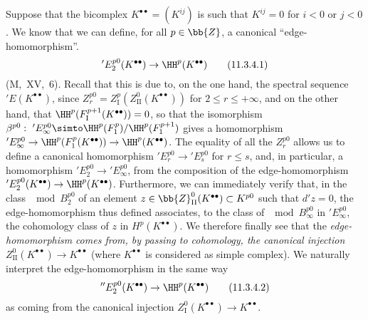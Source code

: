 \begin{env}[11.3.4]
\label{0.11.3.4}
Suppose that the bicomplex $K^{\bullet\bullet}=(K^{ij})$ is such that $K^{ij}=0$ for $i<0$ or $j<0$.
We know that we can define, for all $p\in\bb{Z}$, a canonical ``edge-homomorphism''.
\[
\label{0.11.3.4.1}
  'E_2^{p0}(K^{\bullet\bullet})
  \rightarrow \HH^{p}(K^{\bullet\bullet})
\tag{11.3.4.1}
\]
(M,~XV,~6).
Recall that this is due to, on the one hand, the spectral sequence
$'E(K^{\bullet\bullet})$, since $Z_r^{p0}=Z_{\mathrm{I}}^{p}(Z_{\mathrm{II}}^{0}(K^{\bullet\bullet}))$ for $2\leq r \leq +\infty$, and on the other hand, that $\HH^{p}(F_\mathrm{I}^{p+1}(K^{\bullet\bullet})) = 0$, so that the isomorphism $\beta^{p0}:\ 'E_\infty^{p0} \simto \HH^{p}(F_1^p)/\HH^{p}(F_1^{p+1})$ gives a homomorphism $'E_\infty^{p0} \rightarrow \HH^{p}(F_1^p(K^{\bullet\bullet})) \rightarrow \HH^{p}(K^{\bullet\bullet})$.
The equality of all the $Z_r^{p0}$ allows us to define a canonical homomorphism $'E_r^{p0} \rightarrow 'E_s^{p0}$ for $r \leq s$, and, in particular, a homomorphism $'E_2^{p0} \rightarrow 'E_\infty^{p0}$, from the composition of the edge-homomorphism $'E_2^{p0}(K^{\bullet\bullet}) \rightarrow \HH^{p}(K^{\bullet\bullet})$.
Furthermore, we can immediately verify that, in the class $\mod B_2^{p0}$ of an element $z \in\bb{Z}_\mathrm{II}^0(K^{\bullet\bullet}) \subset K^{p0}$ such that $d'z=0$, the edge-homomorphism thus defined associates, to the class of $\mod B_\infty^{p0}$ in $'E_{\infty}^{p0}$, the cohomology class of $z$ in $H^p(K^{\bullet\bullet})$.
We therefore finally see that the \emph{edge-homomorphism}  \emph{comes from, by passing to cohomology, the canonical injection} $Z_\mathrm{II}^0(K^{\bullet\bullet}) \rightarrow K^{\bullet\bullet}$  (where $K^{\bullet\bullet}$ is considered as simple complex).
We naturally interpret the edge-homomorphism in the same way 
\[
\label{0.11.3.4.2}
  ''E_2^{p0}(K^{\bullet\bullet})
  \rightarrow \HH^{p}(K^{\bullet\bullet})
\tag{11.3.4.2}
\]
as coming from the canonical injection $Z_\mathrm{I}^0(K^{\bullet\bullet}) \rightarrow K^{\bullet\bullet}$.
\end{env}

